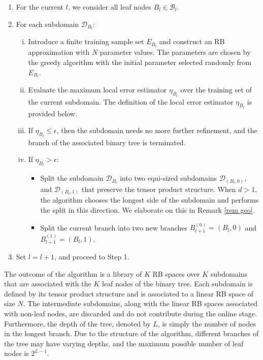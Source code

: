 \documentclass[12pt]{article}
\theoremstyle{remark}
\theoremstyle{definition}
\numberwithin{equation}{section}
\begin{document}
\begin{enumerate}
    \item For the current $l$, we consider all leaf nodes $B_l \in \mathcal{B}_l$.
    
    \item For each subdomain $\mathcal{D}_{B_l}$:
    \begin{enumerate}[(i)]
        \item Introduce a finite training sample set $E_{B_l}$ and construct an RB approximation with $N$ parameter values. The parameters are chosen by the greedy algorithm with the initial parameter selected randomly from $E_{B_l}$.
        
        \item  Evaluate the maximum local error estimator $\eta_{B_l}$ over the training set of the current subdomain. The definition of the local error estimator $\eta_{B_l}$ is provided below.
        
        \item If $\eta_{B_l} \leq \epsilon$, then the subdomain needs no more further refinement, and the branch of the associated binary tree is terminated.
        
        \item If $\eta_{B_l} > \epsilon$:
            \begin{itemize}
                \item Split the subdomain $\mathcal{D}_{B_l}$ into two equi-sized subdomains $\mathcal{D}_{(B_l,0)}$, and $\mathcal{D}_{(B_l,1)}$ that preserve the tensor product structure. When $d>1$, the algorithm chooses the longest side of the subdomain and performs the split in this direction. We elaborate on this in Remark \ref{rem geo}.
                \item Split the current branch into two new branches $B_{l+1}^{(0)}=(B_{l},0)$ and $B_{l+1}^{(1)}=(B_{l},1)$.
            \end{itemize}
        \end{enumerate}
    \item Set $l=l+1$, and proceed to Step 1.
\end{enumerate}

The outcome of the algorithm is a library of $K$ RB spaces over $K$ subdomains that are associated with the $K$ leaf nodes of the binary tree. Each subdomain is defined by its tensor product structure and is associated to a linear RB space of size $N$. The intermediate subdomains, along with the linear RB spaces associated with non-leaf nodes, are discarded and do not contribute during the online stage. Furthermore, the depth of the tree, denoted by $L$, is simply the number of nodes in the longest branch. Due to the structure of the algorithm, different branches of the tree may have varying depths, and the maximum possible number of leaf nodes is $2^{L-1}$. 
\end{document}

